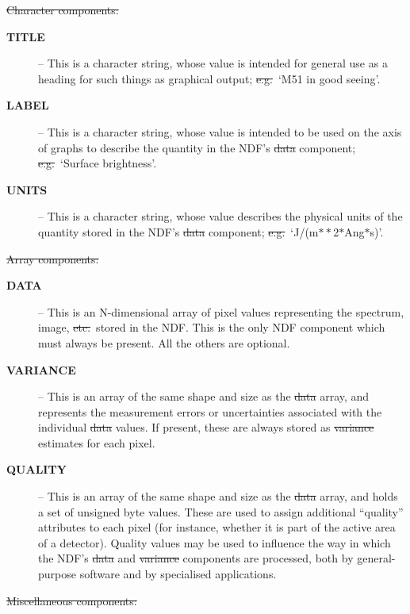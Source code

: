{\large \st{Character components:}}

\begin{description}

\item[{\bf TITLE}] -- This is a character string, whose value is
intended for general use as a heading for such things as graphical output;
\st{e.g.}\ `M51 in good seeing'. 

\item[{\bf LABEL}] -- This is a character string, whose value is
intended to be used on the axis of graphs to describe the quantity in the
NDF's \st{data\/} component; \st{e.g.}\ `Surface brightness'. 

\item[{\bf UNITS}] -- This is a character string, whose value
describes the physical units of the quantity stored in the NDF's \st{data\/}
component; \st{e.g.}\ `J/(m$**$2$*$Ang$*$s)'. 

\end{description}

{\large \st{Array components:}}

\begin{description}

\item[{\bf DATA}] -- This is an N-dimensional array of pixel values
representing the spectrum, image, \st{etc.}\ stored in the NDF. 
This is the only NDF component which must always be present.
All the others are optional. 

\item[{\bf VARIANCE}] -- This is an array of the same shape and size
as the \st{data\/} array, and represents the measurement errors or
uncertainties associated with the individual \st{data\/} values. 
If present, these are always stored as \st{variance\/} estimates for each
pixel. 

\item[{\bf QUALITY}] -- This is an array of the same shape and size as
the \st{data\/} array, and holds a set of unsigned byte values. 
These are used to assign additional ``quality'' attributes to each pixel
(for instance, whether it is part of the active area of a detector). 
Quality values may be used to influence the way in which the NDF's
\st{data\/} and \st{variance\/} components are processed, both by
general-purpose 
software and by specialised applications. 

\end{description}

{\large \st{Miscellaneous components:}}

